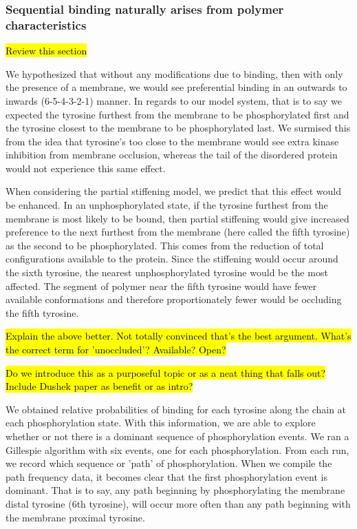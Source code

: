 \documentclass[../../AdvancementSummary.tex]{subfiles}
\begin{document}
\subsubsection{Sequential binding naturally arises from polymer characteristics}

\hl{Review this section}

We hypothesized that without any modifications due to binding, then with only the presence of a membrane, we would see preferential binding in an outwards to inwards (6-5-4-3-2-1) manner.  In regards to our model system, that is to say we expected the tyrosine furthest from the membrane to be phosphorylated first and the tyrosine closest to the membrane to be phosphorylated last.  We surmised this from the idea that tyrosine's too close to the membrane would see extra kinase inhibition from membrane occlusion, whereas the tail of the disordered protein would not experience this same effect. 

When considering the partial stiffening model, we predict that this effect would be enhanced.  In an unphosphorylated state, if the tyrosine furthest from the membrane is most likely to be bound, then partial stiffening would give increased preference to the next furthest from the membrane (here called the fifth tyrosine) as the second to be phosphorylated.  This comes from the reduction of total configurations available to the protein.  Since the stiffening would occur around the sixth tyrosine, the nearest unphosphorylated tyrosine would be the most affected.  The segment of polymer near the fifth tyrosine would have fewer available conformations and therefore proportionately fewer would be occluding the fifth tyrosine.

\hl{Explain the above better.  Not totally convinced that's the best argument.  What's the correct term for 'unoccluded'?  Available?  Open?}

\hl{Do we introduce this as a purposeful topic or as a neat thing that falls out?  Include Dushek paper as benefit or as intro?}

We obtained relative probabilities of binding for each tyrosine along the chain at each phosphorylation state.  With this information, we are able to explore whether or not there is a dominant sequence of phosphorylation events. We ran a Gillespie algorithm with six events, one for each phosphorylation.  From each run, we record which sequence or 'path' of phosphorylation.  When we compile the path frequency data, it becomes clear that the first phosphorylation event is dominant.  That is to say, any path beginning by phosphorylating the membrane distal tyrosine (6th tyrosine), will occur more often than any path beginning with the membrane proximal tyrosine. 
\end{document}
